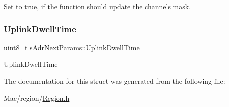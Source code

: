Set to true, if the function should update the channels mask. \mbox{\label{structsAdrNextParams_ac48a8e1de3148431a68b39b072dcfb5d}} 
\subsubsection{\texorpdfstring{Uplink\+Dwell\+Time}{UplinkDwellTime}}
{\footnotesize\ttfamily uint8\+\_\+t s\+Adr\+Next\+Params\+::\+Uplink\+Dwell\+Time}

Uplink\+Dwell\+Time 

The documentation for this struct was generated from the following file\+:\begin{DoxyCompactItemize}
\item 
Mac/region/\hyperlink{Region_8h}{Region.\+h}\end{DoxyCompactItemize}
